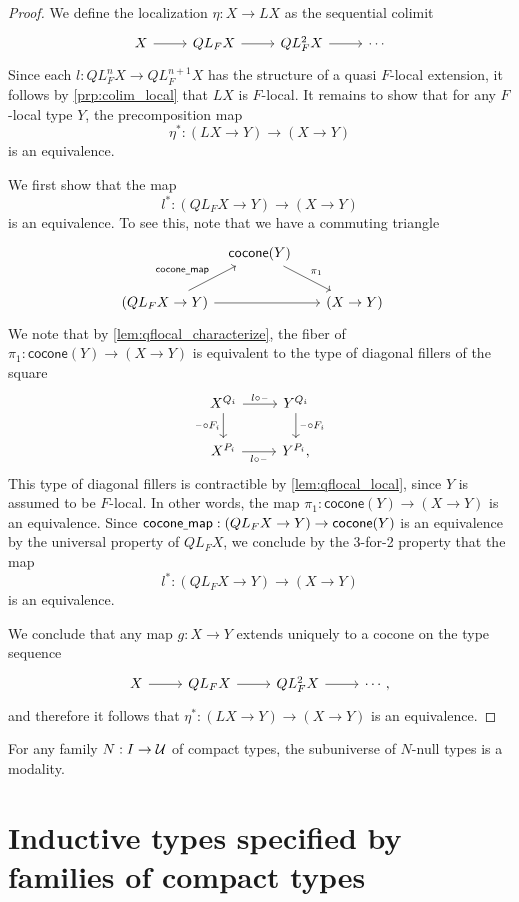 \begin{proof}
We define the localization $\eta:X\to LX$ as the sequential colimit
\begin{equation*}
\begin{tikzcd}
X \arrow[r] & QL_F X \arrow[r] & QL_F^2 X \arrow[r] & \cdots
\end{tikzcd}
\end{equation*}
Since each $l:QL_F^n X\to QL_F^{n+1}X$ has the structure of a quasi $F$-local extension, it follows by \cref{prp:colim_local} that $LX$ is $F$-local. It remains to show that for any $F$-local type $Y$, the precomposition map
\begin{equation*}
\eta^\ast : (LX\to Y)\to (X\to Y)
\end{equation*}
is an equivalence.

We first show that the map
\begin{equation*}
l^\ast : (QL_F X\to Y)\to (X\to Y)
\end{equation*}
is an equivalence. To see this, note that we have a commuting triangle
\begin{equation*}
\begin{tikzcd}[column sep=tiny]
& \mathsf{cocone}(Y) \arrow[dr,"\pi_1"] & \phantom{(QL_F X\to Y)} \\
(QL_F X\to Y) \arrow[rr] \arrow[ur,"\mathsf{cocone\usc{}map}"] & & (X\to Y)
\end{tikzcd}
\end{equation*}
We note that by \cref{lem:qflocal_characterize}, the fiber of $\pi_1:\mathsf{cocone}(Y)\to (X\to Y)$ is equivalent to the type of diagonal fillers of the square
\begin{equation*}
\begin{tikzcd}
X^{Q_i} \arrow[r,"l\circ\blank"] \arrow[d,swap,"\blank\circ F_i"] & Y^{Q_i} \arrow[d,"\blank\circ F_i"] \\
X^{P_i} \arrow[r,swap,"l\circ \blank"] & Y^{P_i},
\end{tikzcd}
\end{equation*}
This type of diagonal fillers is contractible by \cref{lem:qflocal_local}, since $Y$ is assumed to be $F$-local. In other words, the map $\pi_1:\mathsf{cocone}(Y)\to (X\to Y)$ is an equivalence. Since $\mathsf{cocone\underline{\ }{}map}:(QL_F X\to Y)\to \mathsf{cocone}(Y)$ is an equivalence by the universal property of $QL_F X$, we conclude by the 3-for-2 property that the map
\begin{equation*}
l^\ast : (QL_F X\to Y)\to (X\to Y)
\end{equation*}
is an equivalence.

We conclude that any map $g:X\to Y$ extends uniquely to a cocone on the type sequence
\begin{equation*}
\begin{tikzcd}
X \arrow[r] & QL_F X \arrow[r] & QL_F^2 X \arrow[r] & \cdots,
\end{tikzcd}
\end{equation*}
and therefore it follows that $\eta^\ast:(LX\to Y)\to (X\to Y)$ is an equivalence.
\end{proof}

\begin{cor}
For any family $N:I\to \mathcal{U}$ of compact types, the subuniverse of $N$-null types is a modality.
\end{cor}

\section{Inductive types specified by families of compact types}
